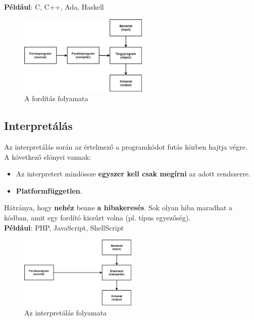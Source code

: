 \documentclass[12pt,margin=0px]{article}
\begin{document}
	\noindent \textbf{Például}: C, C++, Ada, Haskell
	
	\begin{figure}[H]
		\centering
		\includegraphics[width=0.55\textwidth]{img/forditas_folyamatabra.png}
		\caption{A fordítás folyamata}
		\label{fig:forditas_folyamatabra}
	\end{figure}
	
	
\subsection*{Interpretálás}
	
	Az interpretálás során az értelmező a programkódot futás közben hajtja végre.\\

    \noindent A következő elönyei vannak:
    \begin{itemize}
        \item Az interpretert mindössze \textbf{egyszer kell csak megírni} az adott rendszerre.
        \item \textbf{Platformfüggetlen}.
    \end{itemize}

    \noindent Hátránya, hogy \textbf{nehéz} benne \textbf{a hibakeresés}. Sok olyan hiba maradhat a kódban, amit egy fordító kiszűrt volna (pl. típus egyezőség).\\
	
	\noindent \textbf{Például}: PHP, JavaScript, ShellScript

	\begin{figure}[H]
		\centering
		\includegraphics[width=0.5\textwidth]{img/interpretalas_folyamatabra.png}
		\caption{Az interpretálás folyamata}
		\label{fig:interpretalas_folyamatabra}
	\end{figure}
	
\end{document}
